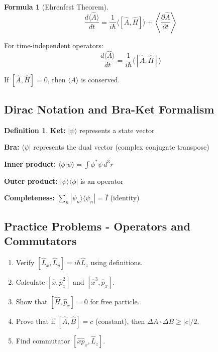 \documentclass[12pt,a4paper]{article}
\theoremstyle{definition}
\newtheorem{definition}[theorem]{Definition}
\newtheorem{formula}[theorem]{Formula}
\begin{document}
\begin{formula}[Ehrenfest Theorem]
\[
\frac{d\langle\hat{A}\rangle}{dt} = \frac{1}{i\hbar}\langle[\hat{A}, \hat{H}]\rangle + \left\langle\frac{\partial\hat{A}}{\partial t}\right\rangle
\]

For time-independent operators:
\[
\frac{d\langle\hat{A}\rangle}{dt} = \frac{1}{i\hbar}\langle[\hat{A}, \hat{H}]\rangle
\]

If $[\hat{A}, \hat{H}] = 0$, then $\langle A\rangle$ is conserved.
\end{formula}

\subsection{Dirac Notation and Bra-Ket Formalism}

\begin{definition}
\textbf{Ket:} $|\psi\rangle$ represents a state vector

\textbf{Bra:} $\langle\psi|$ represents the dual vector (complex conjugate transpose)

\textbf{Inner product:} $\langle\phi|\psi\rangle = \int\phi^*\psi\,d^3r$

\textbf{Outer product:} $|\psi\rangle\langle\phi|$ is an operator

\textbf{Completeness:} $\sum_n |\psi_n\rangle\langle\psi_n| = \hat{I}$ (identity)
\end{definition}

\subsection{Practice Problems - Operators and Commutators}

\begin{enumerate}
    \item Verify $[\hat{L}_x, \hat{L}_y] = i\hbar\hat{L}_z$ using definitions.
    
    \item Calculate $[\hat{x}, \hat{p}_x^2]$ and $[\hat{x}^3, \hat{p}_x]$.
    
    \item Show that $[\hat{H}, \hat{p}_x] = 0$ for free particle.
    
    \item Prove that if $[\hat{A}, \hat{B}] = c$ (constant), then $\Delta A \cdot \Delta B \geq |c|/2$.
    
    \item Find commutator $[\hat{x}\hat{p}_x, \hat{L}_z]$.
\end{enumerate}
\end{document}
